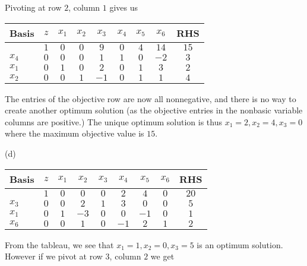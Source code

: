 \documentclass{article}[12pt,a4paper]
\begin{document}
\begin{enumerate}
  	Pivoting at row $2$, column $1$ gives us
  		
		\begin{center}
 		\begin{tabular}{l | c | c c c c c c | c}
             		Basis & $z$ & $x_1$ & $x_2$ & $x_3$ & $x_4$ & $x_5$ & $x_6$ & RHS \\ \hline
  			     & $1$ & $0$ & $0$   & $9$ & $0$  & $4$     & $14$     & $15$  \\ \hline
  			$x_4$ & $0$ & $0$ & $0$   & $1$    & $1$      & $0$     & $-2$     & $3$ \\
  			$x_1$ & $0$ & $1$ & $0$  & $2$    & $0$      & $1$     & $3$     & $2$ \\
  			$x_2$ & $0$ & $0$ & $1$ & $-1$    & $0$      & $1$     & $1$     & $4$ \\
  		\end{tabular}
  		\end{center}
  		
	The entries of the objective row are now all nonnegative, and there is no way to create
	another optimum solution (as the objective entries in the nonbasic variable columns are positive.) 
	The unique optimum solution is thus $x_1 = 2, x_2 = 4, x_3 = 0$ where the maximum objective value is $15$. \newline
	
	(d)
  		\begin{center}
 		\begin{tabular}{l | c | c c c c c c | c}
             		Basis & $z$ & $x_1$ & $x_2$ & $x_3$ & $x_4$ & $x_5$ & $x_6$ & RHS \\ \hline
  			     & $1$ & $0$ & $0$   & $0$ & $2$  & $4$     & $0$     & $20$  \\ \hline
  			$x_3$ & $0$ & $0$ & $2$   & $1$    & $3$      & $0$     & $0$     & $5$ \\
  			$x_1$ & $0$ & $1$ & $-3$  & $0$    & $0$      & $-1$     & $0$     & $1$ \\
  			$x_6$ & $0$ & $0$ & $1$ & $0$    & $-1$      & $2$     & $1$     & $2$ \\
  		\end{tabular}
  		\end{center}
  		
	From the tableau, we see that $x_1 = 1, x_2 = 0, x_3 = 5$ is an optimum solution.
	However if we pivot at row $3$, column $2$ we get
	

\end{enumerate}
\end{document}

